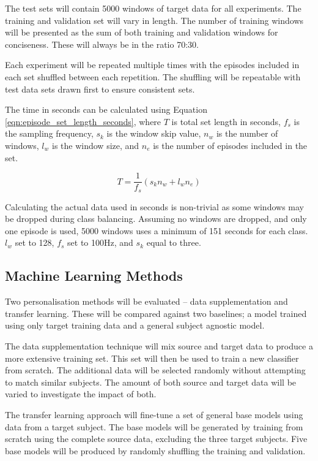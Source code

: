 The test sets will contain 5000 windows of target data for all experiments. The training and validation set will vary in length. The number of training windows will be presented as the sum of both training and validation windows for conciseness. These will always be in the ratio 70:30. 

Each experiment will be repeated multiple times with the episodes included in each set shuffled between each repetition. The shuffling will be repeatable with test data sets drawn first to ensure consistent sets.

The time in seconds can be calculated using Equation \ref{eqn:episode_set_length_seconds}, where $T$ is total set length in seconds, $f_s$ is the sampling frequency, $s_k$ is the window skip value, $n_w$ is the number of windows, $l_w$ is the window size, and $n_e$ is the number of episodes included in the set.

\begin{equation}
    T = \frac{1}{f_s}(s_k n_w + l_w n_e)
    \label{eqn:episode_set_length_seconds}
\end{equation}

Calculating the actual data used in seconds is non-trivial as some windows may be dropped during class balancing. Assuming no windows are dropped, and only one episode is used, 5000 windows uses a minimum of 151 seconds for each class. $l_w$ set to 128, $f_s$ set to 100Hz, and $s_k$ equal to three.

\subsection{Machine Learning Methods}
Two personalisation methods will be evaluated -- data supplementation and transfer learning. These will be compared against two baselines; a model trained using only target training data and a general subject agnostic model.

The data supplementation technique will mix source and target data to produce a more extensive training set. This set will then be used to train a new classifier from scratch. The additional data will be selected randomly without attempting to match similar subjects. The amount of both source and target data will be varied to investigate the impact of both.

The transfer learning approach will fine-tune a set of general base models using data from a target subject. The base models will be generated by training from scratch using the complete source data, excluding the three target subjects. Five base models will be produced by randomly shuffling the training and validation.

